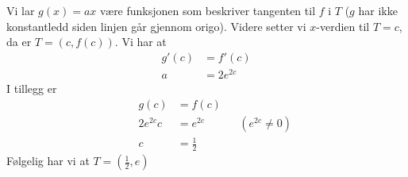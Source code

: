  \\


\newpage
{} \\
Vi lar $g(x)=ax$ være funksjonen som beskriver tangenten til $f$ i $T$ ($g$ har ikke konstantledd siden linjen går gjennom origo). Videre setter vi $x$-verdien til $T=c$, da er $T=(c, f(c))$. Vi har at
\begin{align*}
	g'(c)&=f'(c) \\
	a &= 2e^{2c}
\end{align*}
I tillegg er 
\begin{align*}
&&	g(c)&=f(c)\\
&&	2e^{2c}c &= e^{2c} && (e^{2c}\neq0) \\
&& 	c &= \frac{1}{2}
\end{align*}
Følgelig har vi at
$T=\left(\frac{1}{2}, e\right)$
\newpage

